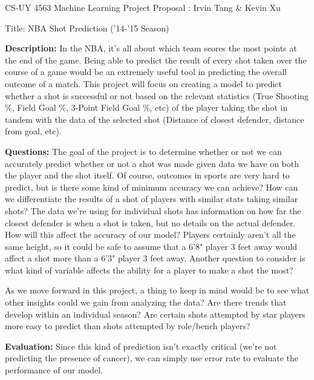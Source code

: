 \documentclass[12pt]{article}
\begin{document}
  
\pagestyle{empty}
 
\begin{center} CS-UY 4563 Machine Learning Project Proposal : Irvin Tang \& Kevin Xu 
\end{center}
\begin{center}
Title: NBA Shot Prediction ('14-'15 Season)
\end{center}

\textbf{Description:} In the NBA, it's all about which team scores the most points at the end of the game. Being able to predict the result of every shot taken over the course of a game would be an extremely useful tool in predicting the overall outcome of a match. This project will focus on creating a model to predict whether a shot is successful or not based on the relevant statistics (True Shooting \%, Field Goal \%, 3-Point Field Goal \%, etc) of the player taking the shot in tandem with the data of the selected shot (Distance of closest defender, distance from goal, etc). 

\linespread{1.5}
\textbf{Questions:} The goal of the project is to determine whether or not we can accurately predict whether or not a shot was made given data we have on both the player and the shot itself. Of course, outcomes in sports are very hard to predict, but is there some kind of minimum accuracy we can achieve? How can we differentiate the results of a shot of players with similar stats taking similar shots? The data we're using for individual shots has information on how far the closest defender is when a shot is taken, but no details on the actual defender. How will this affect the accuracy of our model? Players certainly aren't all the same height, so it could be safe to assume that a 6'8" player 3 feet away would affect a shot more than a 6'3" player 3 feet away. Another question to consider is what kind of variable affects the ability for a player to make a shot the most? 

As we move forward in this project, a thing to keep in mind would be to see what other insights could we gain from analyzing the data? Are there trends that develop within an individual season? Are certain shots attempted by star players more easy to predict than shots attempted by role/bench players?

\textbf{Evaluation:} Since this kind of prediction isn't exactly critical (we're not predicting the presence of cancer), we can simply use error rate to evaluate the performance of our model. 
\end{document}
